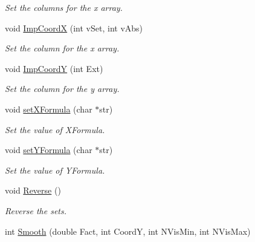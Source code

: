 \begin{DoxyCompactItemize}
\begin{DoxyCompactList}\small\item\em Set the columns for the x array. \end{DoxyCompactList}\item 
void \hyperlink{classVarDatFile_ac4e4ea335271e56d3a3dbc54bf0e8847}{Imp\+CoordX} (int v\+Set, int v\+Abs)\hypertarget{classVarDatFile_ac4e4ea335271e56d3a3dbc54bf0e8847}{}\label{classVarDatFile_ac4e4ea335271e56d3a3dbc54bf0e8847}

\begin{DoxyCompactList}\small\item\em Set the column for the x array. \end{DoxyCompactList}\item 
void \hyperlink{classVarDatFile_a4b08a81fa612f8cbeabb3618624fe7ca}{Imp\+CoordY} (int Ext)\hypertarget{classVarDatFile_a4b08a81fa612f8cbeabb3618624fe7ca}{}\label{classVarDatFile_a4b08a81fa612f8cbeabb3618624fe7ca}

\begin{DoxyCompactList}\small\item\em Set the column for the y array. \end{DoxyCompactList}\item 
void \hyperlink{classVarDatFile_a589e6b70b557686f8a829acf53ec6b0c}{set\+X\+Formula} (char $\ast$str)\hypertarget{classVarDatFile_a589e6b70b557686f8a829acf53ec6b0c}{}\label{classVarDatFile_a589e6b70b557686f8a829acf53ec6b0c}

\begin{DoxyCompactList}\small\item\em Set the value of X\+Formula. \end{DoxyCompactList}\item 
void \hyperlink{classVarDatFile_adb4227dfb05be39d72d1b89cdc44eb5a}{set\+Y\+Formula} (char $\ast$str)\hypertarget{classVarDatFile_adb4227dfb05be39d72d1b89cdc44eb5a}{}\label{classVarDatFile_adb4227dfb05be39d72d1b89cdc44eb5a}

\begin{DoxyCompactList}\small\item\em Set the value of Y\+Formula. \end{DoxyCompactList}\item 
void \hyperlink{classVarDatFile_ae1b551cc51c9d556342b27b466a7c7cb}{Reverse} ()\hypertarget{classVarDatFile_ae1b551cc51c9d556342b27b466a7c7cb}{}\label{classVarDatFile_ae1b551cc51c9d556342b27b466a7c7cb}

\begin{DoxyCompactList}\small\item\em Reverse the sets. \end{DoxyCompactList}\item 
int \hyperlink{classVarDatFile_a42240e743f2a3ea3b430b915e50c5350}{Smooth} (double Fact, int CoordY, int N\+Vis\+Min, int N\+Vis\+Max)\hypertarget{classVarDatFile_a42240e743f2a3ea3b430b915e50c5350}{}\label{classVarDatFile_a42240e743f2a3ea3b430b915e50c5350}


\end{DoxyCompactItemize}
